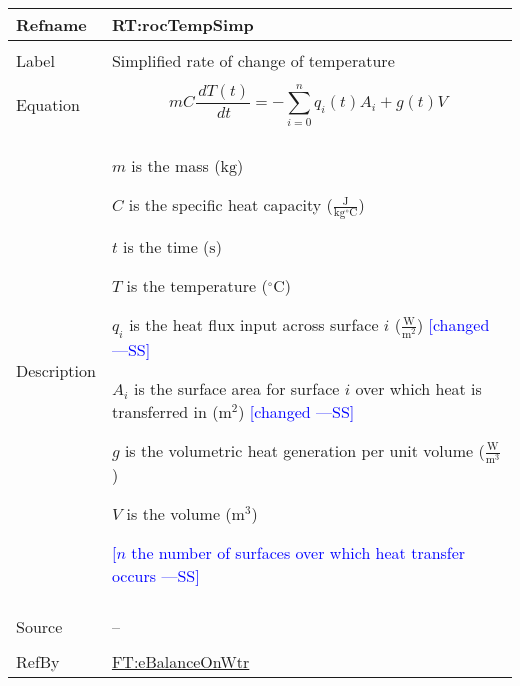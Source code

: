 \documentclass[12pt]{article}
\newcommand{\authornote}[3]{\textcolor{#1}{[#3 ---#2]}}
\newcommand{\authornote}[3]{}
\newcommand{\wss}[1]{\authornote{blue}{SS}{#1}}
\begin{document}
\vspace{\baselineskip}
\noindent
\begin{minipage}{\textwidth}
\begin{tabular}{>{\raggedright}p{}>{\raggedright\arraybackslash}p{}}
\toprule \textbf{Refname} & \textbf{RT:rocTempSimp}
\label{RT:rocTempSimp}
\\ \midrule \\
Label & Simplified rate of change of temperature
        
\\ \midrule \\
Equation & \begin{displaymath}
           m C \frac{\,dT(t)}{\,dt} = -\sum_{i=0}^n {q_i(t)} {A_i} + g(t) V
           \end{displaymath}
\\ \midrule \\
Description & \begin{symbDescription}
              \item{$m$ is the mass (${\text{kg}}$)}
              \item{$C$ is the specific heat capacity ($\frac{\text{J}}{\text{kg}{}^{\circ}\text{C}}$)}
              \item{$t$ is the time (${\text{s}}$)}
              \item{$T$ is the temperature (${{}^{\circ}\text{C}}$)}
              \item{${q_{i}}$ is the heat flux input across surface $i$ ($\frac{\text{W}}{\text{m}^{2}}$)} \wss{changed}
              \item{${A_{i}}$ is the surface area for surface $i$ over which heat is transferred in (${\text{m}^{2}}$)} \wss{changed}
              \item{$g$ is the volumetric heat generation per unit volume ($\frac{\text{W}}{\text{m}^{3}}$)}
              \item{$V$ is the volume (${\text{m}^{3}}$)}
              \item \wss{$n$ the number of surfaces over which heat transfer occurs}
              \end{symbDescription}
\\ \midrule \\
Source & --
         
\\ \midrule \\
RefBy & \hyperref[FT:eBalanceOnWtr]{FT:eBalanceOnWtr}

\\ \bottomrule
\end{tabular}
\end{minipage}
\end{document}
